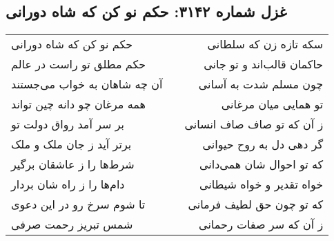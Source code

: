 \begin{center}
\section*{غزل شماره ۳۱۴۲: حکم نو کن که شاه دورانی}
\label{sec:3142}
\begin{longtable}{l p{0.5cm} r}
حکم نو کن که شاه دورانی
&&
سکه تازه زن که سلطانی
\\
حکم مطلق تو راست در عالم
&&
حاکمان قالب‌اند و تو جانی
\\
آن چه شاهان به خواب می‌جستند
&&
چون مسلم شدت به آسانی
\\
همه مرغان چو دانه چین تواند
&&
تو همایی میان مرغانی
\\
بر سر آمد رواق دولت تو
&&
ز آن که تو صاف صاف انسانی
\\
برتر آید ز جان ملک و ملک
&&
گر دهی دل به روح حیوانی
\\
شرط‌ها را ز عاشقان برگیر
&&
که تو احوال شان همی‌دانی
\\
دام‌ها را ز راه شان بردار
&&
خواه تقدیر و خواه شیطانی
\\
تا شوم سرخ رو در این دعوی
&&
که تو چون حق لطیف فرمانی
\\
شمس تبریز رحمت صرفی
&&
ز آن که سر صفات رحمانی
\\
\end{longtable}
\end{center}
